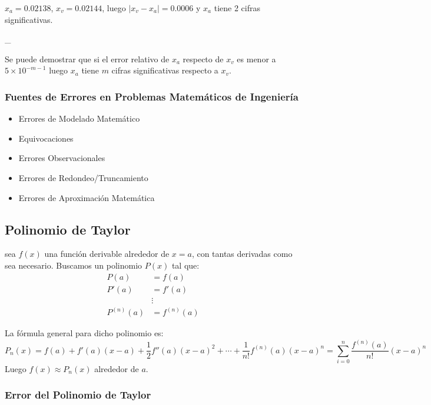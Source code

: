 \Ejemplo \(x_a = 0.02138\), \(x_v = 0.02144\), luego
\(|x_v - x_a| = 0.0006\) y \(x_a\) tiene 2 cifras significativas.

\_

Se puede demostrar que si el error relativo de \(x_a\) respecto de
\(x_v\) es menor a \(5 \times 10 ^{-m-1}\) luego \(x_a\) tiene \(m\)
cifras significativas respecto a \(x_v\).

\hypertarget{fuentes-de-errores-en-problemas-matemuxe1ticos-de-ingenieruxeda}{%
\subsubsection{Fuentes de Errores en Problemas Matemáticos de
Ingeniería}\label{fuentes-de-errores-en-problemas-matemuxe1ticos-de-ingenieruxeda}}

\begin{itemize}
\tightlist
\item
  Errores de Modelado Matemático
\item
  Equivocaciones
\item
  Errores Observacionales
\item
  Errores de Redondeo/Truncamiento
\item
  Errores de Aproximación Matemática
\end{itemize}

\hypertarget{polinomio-de-taylor}{%
\subsection{Polinomio de Taylor}\label{polinomio-de-taylor}}

\Definicion sea \(f(x)\) una función derivable alrededor de \(x = a\),
con tantas derivadas como sea necesario. Buscamos un polinomio \(P(x)\)
tal que: \begin{align*}
P(a) &= f(a) \\
P'(a) &= f'(a) \\
&\vdots \\
P^{(n)}(a) &= f^{(n)}(a)
\end{align*}

La fórmula general para dicho polinomio es: \[
P_n(x) 
= f(a) 
+ f'(a)(x-a) 
+ \frac{1}{2}f''(a)(x-a)^2 
+ \cdots + \frac{1}{n!} f^{(n)}(a)(x-a)^n
= \sum_{i=0}^n \frac{f^{(n)}(a)}{n!} (x-a)^n
\] Luego \(f(x) \approx P_n(x)\) alrededor de \(a\).

\hypertarget{error-del-polinomio-de-taylor}{%
\subsubsection{Error del Polinomio de
Taylor}\label{error-del-polinomio-de-taylor}}

